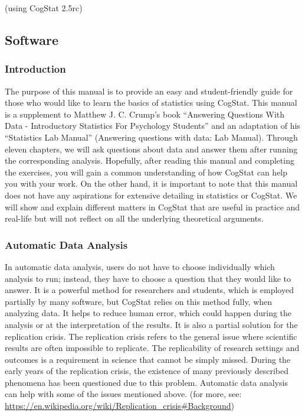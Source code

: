 \documentclass[
]{book}
\begin{document}
(using CogStat 2.5rc)

\hypertarget{software-1}{%
\subsection{Software}\label{software-1}}

\hypertarget{introduction}{%
\subsubsection{Introduction}\label{introduction}}

The purpose of this manual is to provide an easy and student-friendly guide for those who would like to learn the basics of statistics using CogStat. This manual is a supplement to Matthew J. C. Crump's book ``Answering Questions With Data - Introductory Statistics For Psychology Students'' and an adaptation of his ``Statistics Lab Manual'' (Answering questions with data: Lab Manual). Through eleven chapters, we will ask questions about data and answer them after running the corresponding analysis. Hopefully, after reading this manual and completing the exercises, you will gain a common understanding of how CogStat can help you with your work. On the other hand, it is important to note that this manual does not have any aspirations for extensive detailing in statistics or CogStat. We will show and explain different matters in CogStat that are useful in practice and real-life but will not reflect on all the underlying theoretical arguments.

\hypertarget{automatic-data-analysis}{%
\subsubsection{Automatic Data Analysis}\label{automatic-data-analysis}}

In automatic data analysis, users do not have to choose individually which analysis to run; instead, they have to choose a question that they would like to answer. It is a powerful method for researchers and students, which is employed partially by many software, but CogStat relies on this method fully, when analyzing data. It helps to reduce human error, which could happen during the analysis or at the interpretation of the results. It is also a partial solution for the replication crisis. The replication crisis refers to the general issue where scientific results are often impossible to replicate. The replicability of research settings and outcomes is a requirement in science that cannot be simply missed. During the early years of the replication crisis, the existence of many previously described phenomena has been questioned due to this problem. Automatic data analysis can help with some of the issues mentioned above. (for more, see: \url{https://en.wikipedia.org/wiki/Replication_crisis\#Background})
\end{document}
